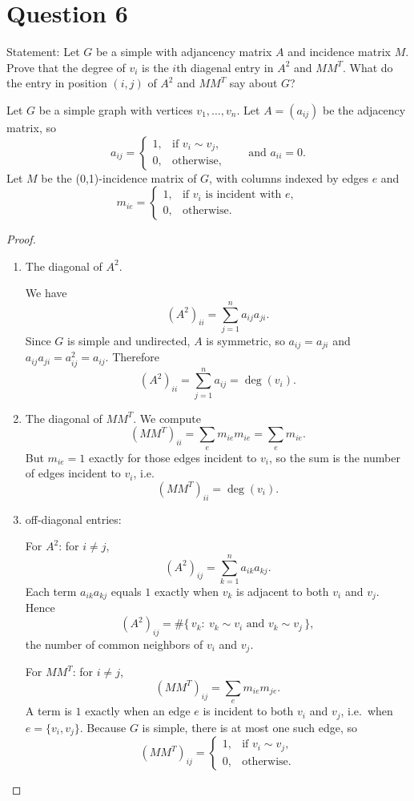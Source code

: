 \documentclass[11pt]{article}
\begin{document}
\newpage

\section*{Question 6}

Statement: Let $G$ be a simple with adjancency matrix $A$ and incidence matrix $M$. Prove that the degree of $v_i$ is the $i$th diagenal entry in $A^2$ and $MM^T$. What do the entry in position $(i,j)$ of $A^2$ and $MM^T$ say about $G$?

\medskip

Let $G$ be a simple graph with vertices $v_1,\dots,v_n$.
Let $A=(a_{ij})$ be the adjacency matrix, so
\[
a_{ij}=\begin{cases}
1,& \text{if } v_i\sim v_j,\\
0,& \text{otherwise},
\end{cases}
\qquad\text{and }a_{ii}=0.
\]
Let $M$ be the (0,1)-incidence matrix of $G$, with columns indexed by edges $e$ and
\[
m_{i e}=\begin{cases}
1,& \text{if } v_i \text{ is incident with } e,\\
0,& \text{otherwise}.
\end{cases}
\]

\begin{proof}
\begin{enumerate}
    \item The diagonal of $A^2$.
    
We have
\[
(A^2)_{ii}=\sum_{j=1}^n a_{ij}a_{ji}.
\]
Since $G$ is simple and undirected, $A$ is symmetric, so $a_{ij}=a_{ji}$ and
$a_{ij}a_{ji}=a_{ij}^2=a_{ij}$. Therefore
\[
(A^2)_{ii}=\sum_{j=1}^n a_{ij}=\deg(v_i).
\]

\item The diagonal of $MM^T$.
We compute
\[
(MM^T)_{ii}=\sum_{e} m_{i e}m_{i e}=\sum_{e} m_{i e}.
\]
But $m_{ie}=1$ exactly for those edges incident to $v_i$, so the sum is the number of
edges incident to $v_i$, i.e.
\[
(MM^T)_{ii}=\deg(v_i).
\]

\item off-diagonal entries:

For $A^2$: for $i\neq j$,
\[
(A^2)_{ij}=\sum_{k=1}^n a_{ik}a_{kj}.
\]
Each term $a_{ik}a_{kj}$ equals $1$ exactly when $v_k$ is adjacent to both $v_i$ and $v_j$.
Hence
\[
(A^2)_{ij}=\#\{\,v_k:\ v_k\sim v_i \text{ and } v_k\sim v_j\,\},
\]
the number of common neighbors of $v_i$ and $v_j$.

For $MM^T$: for $i\neq j$,
\[
(MM^T)_{ij}=\sum_e m_{ie}m_{je}.
\]
A term is $1$ exactly when an edge $e$ is incident to both $v_i$ and $v_j$, i.e.\ when
$e=\{v_i,v_j\}$. Because $G$ is simple, there is at most one such edge, so
\[
(MM^T)_{ij}=
\begin{cases}
1,& \text{if } v_i\sim v_j,\\
0,& \text{otherwise}.
\end{cases}
\]
\end{enumerate}
\end{proof}
\end{document}
